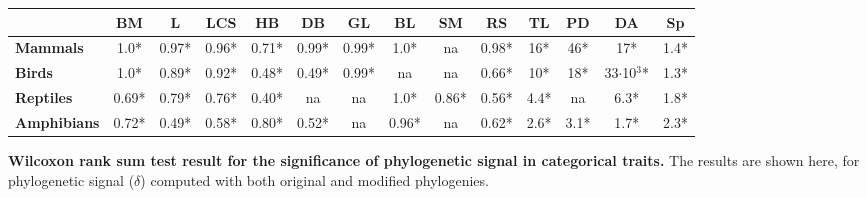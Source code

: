 \documentclass[11pt]{article}
\begin{document}
\begin{table}[h!]
\begin{center}
\begin{tabular}{|l|c|c|c|c|c|c|c|c|c|c|c|c|c|}
\multicolumn{1}{|c|}{}                                & \textbf{BM}    & \textbf{L}   & \textbf{LCS}   & \textbf{HB}   & \textbf{DB}   & \textbf{GL}   & \textbf{BL}   & \textbf{SM}   & \textbf{RS}   & \textbf{TL}           & \textbf{PD}           & \textbf{DA}                & \textbf{Sp}          \\ \hline
\textbf{Mammals}                                      & 1.0*           & 0.97*        & 0.96*          & 0.71*         & 0.99*         & 0.99*         & 1.0*          & na            & 0.98*         & 16*                   & 46*                   & 17*                        & 1.4*                 \\ \hline
\textbf{Birds}                                        & 1.0*           & 0.89*        & 0.92*          & 0.48*         & 0.49*         & 0.99*         & na            & na            & 0.66*         & 10*                   & 18*                   & 33$\cdot$10$^3$*           & 1.3*                 \\ \hline
\textbf{Reptiles}                                     & 0.69*          & 0.79*        & 0.76*          & 0.40*         & na            & na            & 1.0*          & 0.86*         & 0.56*         & 4.4*                  & na                    & 6.3*                       & 1.8*                 \\ \hline
\textbf{Amphibians}                                   & 0.72*          & 0.49*        & 0.58*          & 0.80*         & 0.52*         & na            & 0.96*         & na            & 0.62*         & 2.6*                  & 3.1*                  & 1.7*                       & 2.3*                 \\ \hline
\end{tabular}
\end{center}
\end{table}

\pagebreak
\begin{table}[h!]
\renewcommand{\baselinestretch}{1}
\renewcommand{\arraystretch}{1.2}
\begin{center}\fontsize{9}{11}\selectfont
\caption[Wilcoxon rank sum test results for the significance of phylogenetic signal in categorical traits]{\textbf{Wilcoxon rank sum test result for the significance of phylogenetic signal in categorical traits.} The results are shown here, for phylogenetic signal ($\delta$) computed with both original and modified phylogenies.}
\end{center}
\end{table}
\end{document}
